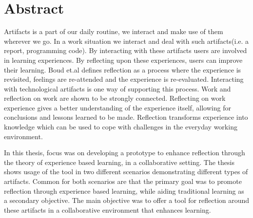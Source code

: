 \chapter*{Abstract}
Artifacts is a part of our daily routine, we interact and make use of them wherever we go. In a work situation we interact and deal with such artifacts(i.e. a report, programming code). By interacting with these artifacts users are involved in learning experiences. By reflecting upon these experiences, users can improve their learning. Boud et.al defines reflection as a process where the experience is revisited, feelings are re-attended and the experience is re-evaluated\citep{boudreflection1985}. Interacting with technological artifacts is one way of supporting this process. 
Work and reflection on work are shown to be strongly connected\citep{Schon1983}\citep{Chaiklin1993}. Reflecting on work experience gives a better understanding of the experience itself, allowing for conclusions and lessons learned to be made. 
Reflection transforms experience into knowledge which can be used to cope with challenges in the everyday working environment. 

In this thesis, focus was on developing a prototype to enhance reflection through the theory of experience based learning, in a collaborative setting. The thesis shows usage of the tool in two different scenarios demonstrating different types of artifacts. Common for both scenarios are that the primary goal was to promote reflection through experience based learning, while aiding traditional learning as a secondary objective. 
The main objective was to offer a tool for reflection around these artifacts in a collaborative environment that enhances learning. 